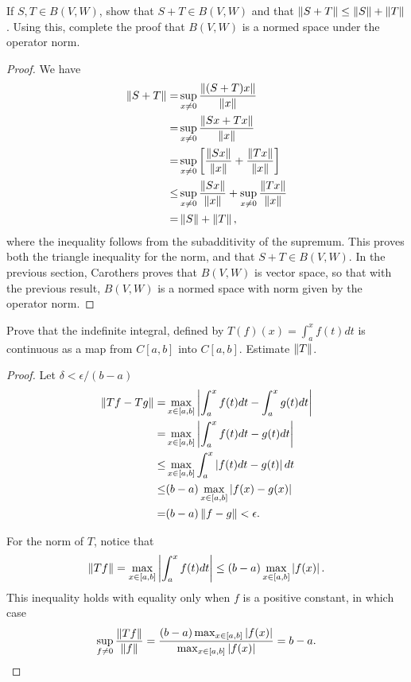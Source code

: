 \begin{exercise}{79}
If $S,T\in B(V,W)$, show that $S+T \in B(V,W)$ and that $\left\lVert S+T\right\rVert \leq \left\lVert S\right\rVert + \left\lVert T\right\rVert$.
Using this, complete the proof that $B(V,W)$ is a normed space under the operator norm.
\end{exercise}
\begin{proof}
We have 
\begin{align*}
    \left\lVert S+T\right\rVert 
    =& \sup_{x\neq 0} \frac{\left\lVert (S+T)x\right\rVert}{\left\lVert x\right\rVert}\\
    =& \sup_{x\neq 0} \frac{\left\lVert Sx+Tx\right\rVert}{\left\lVert x\right\rVert}\\
    =& \sup_{x\neq 0} \left[ \frac{\left\lVert Sx\right\rVert}{\left\lVert x\right\rVert}
    + \frac{\left\lVert Tx\right\rVert}{\left\lVert x\right\rVert}\right]\\
    \leq& \sup_{x\neq 0} \frac{\left\lVert Sx\right\rVert}{\left\lVert x\right\rVert} 
    + \sup_{x\neq 0} \frac{\left\lVert Tx\right\rVert}{\left\lVert x\right\rVert}\\
    =& \left\lVert S\right\rVert + \left\lVert T\right\rVert,
\end{align*}
where the inequality follows from the subadditivity of the supremum.
This proves both the triangle inequality for the norm, and that $S+T\in B(V,W)$.
In the previous section, Carothers proves that $B(V,W)$ is vector space, so that with the previous result, $B(V,W)$ is a normed space with norm given by the operator norm.
\end{proof} 

\begin{exercise}{81}
Prove that the indefinite integral, defined by $T(f)(x) = \int_a^x f(t) dt$ is continuous as a map from $C[a,b]$ into $C[a,b]$.
Estimate $\left\lVert T\right\rVert$.
\end{exercise}
\begin{proof}
Let $\delta <\epsilon/(b-a)$
\begin{align*}
    \left\lVert Tf-Tg\right\rVert
    =& \max_{x \in [a,b]} \left\lvert \int_a^x f(t)dt-\int_a^x g(t)dt\right\rvert\\
    =& \max_{x \in [a,b]} \left\lvert \int_a^x f(t)dt - g(t)dt\right\rvert\\
    \leq& \max_{x \in [a,b]} \int_a^x \left\lvert f(t)dt - g(t)\right\rvert dt\\
    \leq& (b-a)\max_{x \in [a,b]} \left\lvert f(x) - g(x)\right\rvert\\
    =& (b-a)\left\lVert f-g\right\rVert < \epsilon.
\end{align*}

For the norm of $T$, notice that 
\begin{align*}
    \left\lVert Tf\right\rVert = \max_{x\in[a,b]}\left\lvert \int_a^x f(t) dt\right\rvert \leq (b-a)\max_{x\in [a,b]}\left\lvert f(x)\right\rvert.
\end{align*}
This inequality holds with equality only when $f$ is a positive constant, in which case
\begin{align*}
    \sup_{f\neq 0}\frac{\left\lVert Tf\right\rVert}{\left\lVert f\right\rVert}
    = \frac{(b-a) \max_{x\in [a,b]}\left\lvert f(x)\right\rvert}{\max_{x\in [a,b]}\left\lvert f(x)\right\rvert} = b-a.
\end{align*}
\end{proof} 

